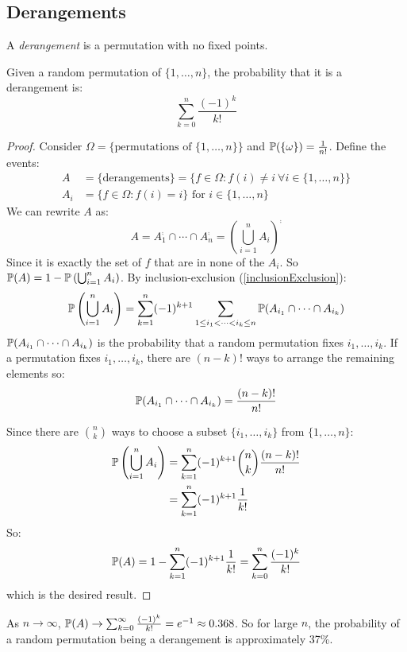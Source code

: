 \documentclass[../main.tex]{subfiles}
\begin{document}
\subsection{Derangements}
\begin{definition}[Derangement]
  A \textit{derangement} is a permutation with no fixed points.
\end{definition}
\begin{proposition}
  Given a random permutation of $\{1, \ldots, n\}$, the probability that it is a derangement is:
  \[
    \sum_{k = 0}^{n} \frac{(-1)^{k}}{k!}
  \]
\end{proposition}
\begin{proof}
  Consider $\Omega = \{\text{permutations of } \{1, \ldots, n\}\}$ and $\P(\{\omega\}) = \frac{1}{n!}$.
  Define the events:
  \begin{align*}
    A &= \{\text{derangements}\} = \{f \in \Omega: f(i) \neq i\ \forall i \in \{1, \ldots, n\}\} \\
    A_i &= \{f \in \Omega: f(i) = i\} \text{ for $i \in \{1, \ldots, n\}$}
  \end{align*}
  We can rewrite $A$ as:
  \[
    A = A^{\comp}_1 \cap \cdots \cap A^{\comp}_n = \left(\bigcup_{i = 1}^{n} A_i\right)^{\comp}
  \]
  Since it is exactly the set of $f$ that are in none of the $A_i$.
  So $\P(A) = 1 - \P\left(\bigcup_{i = 1}^{n} A_i\right)$.
  By inclusion-exclusion (\cref{inclusionExclusion}):
  \[
    \P\left(\bigcup_{i = 1}^{n} A_i\right) = \sum_{k = 1}^{n} (-1)^{k + 1} \sum_{1 \leq i_1 < \cdots < i_k \leq n} \P(A_{i_1} \cap \cdots \cap A_{i_k})
  \]
  $\P(A_{i_1} \cap \cdots \cap A_{i_k})$ is the probability that a random permutation fixes $i_1, \ldots, i_k$.
  If a permutation fixes $i_1, \ldots, i_k$, there are $(n - k)!$ ways to arrange the remaining elements so:
  \[
    \P(A_{i_1} \cap \cdots \cap A_{i_k}) = \frac{(n - k)!}{n!}
  \]

  Since there are $\binom{n}{k}$ ways to choose a subset $\{i_1, \ldots, i_k\}$ from $\{1, \ldots, n\}$:
  \begin{align*}
    \P\left(\bigcup_{i = 1}^{n} A_i\right) &= \sum_{k = 1}^{n} (-1)^{k + 1} \binom{n}{k} \frac{(n - k)!}{n!} \\
                                           &= \sum_{k = 1}^{n} (-1)^{k + 1} \frac{1}{k!}
  \end{align*}
  So:
  \[
    \P(A) = 1 - \sum_{k = 1}^{n} (-1)^{k + 1}\frac{1}{k!} = \sum_{k = 0}^{n} \frac{(-1)^{k}}{k!}
  \]
  which is the desired result.
\end{proof}
\begin{remark}
  As $n \to \infty$, $\P(A) \to \sum_{k = 0}^{\infty} \frac{(-1)^{k}}{k!} = e^{-1} \approx 0.368$.
  So for large $n$, the probability of a random permutation being a derangement is approximately 37\%.
\end{remark}
\end{document}
